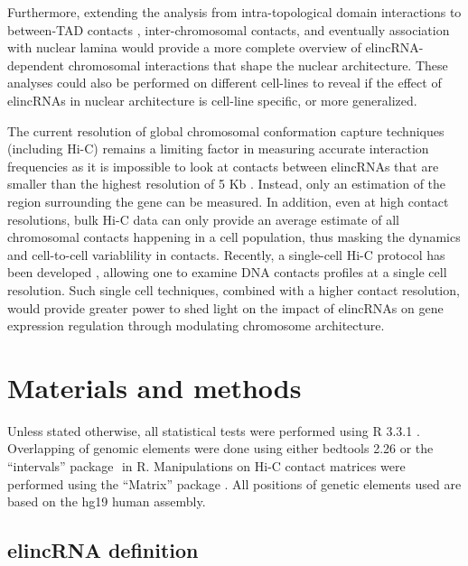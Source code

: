 \documentclass[11pt,a4paper]{report}
\begin{document}
Furthermore, extending the analysis from intra-topological domain interactions to between-TAD contacts \cite{Fraser2015}⁠, inter-chromosomal contacts, and eventually association with nuclear lamina would provide a more complete overview of elincRNA-dependent chromosomal interactions that shape the nuclear architecture. These analyses could also be performed on different cell-lines to reveal if the effect of elincRNAs in nuclear architecture is cell-line specific, or more generalized. 

The current resolution of global chromosomal conformation capture techniques (including Hi-C) remains a limiting factor in measuring accurate interaction frequencies as it is impossible to look at contacts between elincRNAs that are smaller than the highest resolution of 5 Kb \cite{Rao2014}⁠. Instead, only an estimation of the region surrounding the gene can be measured. In addition, even at high contact resolutions, bulk Hi-C data can only provide an average estimate of all chromosomal contacts happening in a cell population, thus masking the dynamics and cell-to-cell variablility in contacts. Recently, a single-cell Hi-C protocol has been developed \cite{Nagano2013}⁠, allowing one to examine DNA contacts profiles at a single cell resolution. Such single cell techniques, combined with a higher contact resolution, would provide greater power to shed light on the impact of elincRNAs on gene expression regulation through modulating chromosome architecture.

\section*{Materials and methods}
Unless stated otherwise, all statistical tests were performed using R 3.3.1 \cite{RCoreTeam2016}⁠. Overlapping of genomic elements were done using either bedtools 2.26 \cite{Quinlan2010}⁠or the “intervals” package \cite{Bourgon2015}⁠ in R. Manipulations on Hi-C contact matrices were performed using the “Matrix” package \cite{Bates2016}⁠. All positions of genetic elements used are based on the hg19 human assembly.

\subsection*{elincRNA definition}
\end{document}

